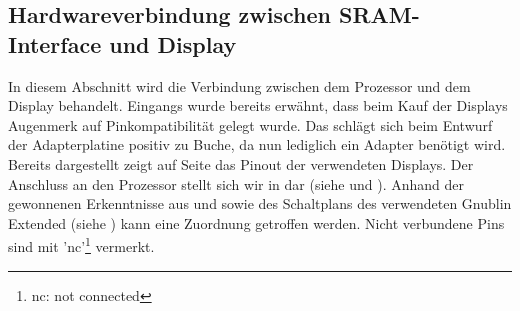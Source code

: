 \newpage
\subsection{Hardwareverbindung zwischen SRAM-Interface und Display}
In diesem Abschnitt wird die Verbindung zwischen dem Prozessor und dem Display behandelt. Eingangs wurde bereits erwähnt, dass beim Kauf der Displays Augenmerk auf Pinkompatibilität gelegt wurde. Das schlägt sich beim Entwurf der Adapterplatine positiv zu Buche, da nun lediglich ein Adapter benötigt wird. \newline
Bereits dargestellt zeigt  auf Seite \pageref{fig:8080_pinout} das Pinout der verwendeten Displays. Der Anschluss an den Prozessor stellt sich wir in  dar (siehe \cite{Coldtears2014} und \cite{EmbeddedProjects2013}). Anhand der gewonnenen Erkenntnisse aus  und  sowie des Schaltplans des verwendeten Gnublin Extended (siehe \cite{EmbeddedProjects2013}) kann eine Zuordnung getroffen werden. Nicht verbundene Pins sind mit 'nc'\footnote{nc: not connected} vermerkt.

